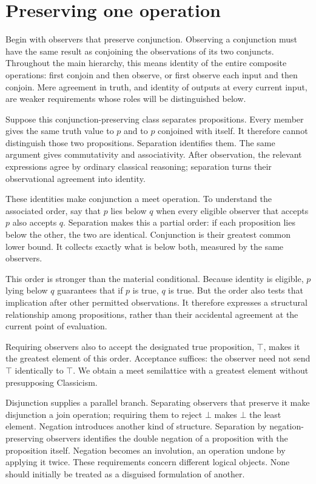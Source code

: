 \documentclass[12pt,letterpaper]{article}
\begin{document}
\section{Preserving one operation}

Begin with observers that preserve conjunction. Observing a conjunction must have the same result as conjoining the observations of its two conjuncts. Throughout the main hierarchy, this means identity of the entire composite operations: first conjoin and then observe, or first observe each input and then conjoin. Mere agreement in truth, and identity of outputs at every current input, are weaker requirements whose roles will be distinguished below.


Suppose this conjunction-preserving class separates propositions. Every member gives the same truth value to $p$ and to $p$ conjoined with itself. It therefore cannot distinguish those two propositions. Separation identifies them. The same argument gives commutativity and associativity. After observation, the relevant expressions agree by ordinary classical reasoning; separation turns their observational agreement into identity.~\cite[\S\S2--4]{r2}


These identities make conjunction a meet operation. To understand the associated order, say that $p$ lies below $q$ when every eligible observer that accepts $p$ also accepts $q$. Separation makes this a partial order: if each proposition lies below the other, the two are identical. Conjunction is their greatest common lower bound. It collects exactly what is below both, measured by the same observers.


This order is stronger than the material conditional. Because identity is eligible, $p$ lying below $q$ guarantees that if $p$ is true, $q$ is true. But the order also tests that implication after other permitted observations. It therefore expresses a structural relationship among propositions, rather than their accidental agreement at the current point of evaluation.


Requiring observers also to accept the designated true proposition, $\top$, makes it the greatest element of this order. Acceptance suffices: the observer need not send $\top$ identically to $\top$. We obtain a meet semilattice with a greatest element without presupposing Classicism.~\cite[\S2]{r3}


Disjunction supplies a parallel branch. Separating observers that preserve it make disjunction a join operation; requiring them to reject $\bot$ makes $\bot$ the least element. Negation introduces another kind of structure. Separation by negation-preserving observers identifies the double negation of a proposition with the proposition itself. Negation becomes an involution, an operation undone by applying it twice. These requirements concern different logical objects. None should initially be treated as a disguised formulation of another.
\end{document}
